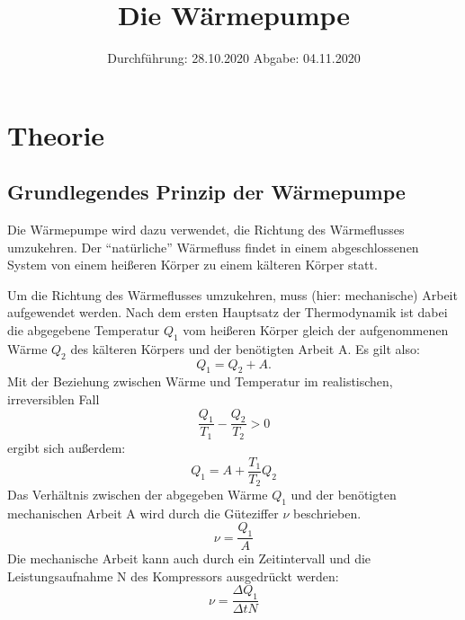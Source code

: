 

\subject{D206}
\title{Die Wärmepumpe}
\date{
    Durchführung: 28.10.2020
    \hspace{3em}
    Abgabe: 04.11.2020
}



\maketitle
\thispagestyle{empty}
\tableofcontents
\newpage

\section{Theorie} \label{sec:Theorie}

\subsection{Grundlegendes Prinzip der Wärmepumpe}

    Die Wärmepumpe wird dazu verwendet, die Richtung des Wärmeflusses umzukehren.
    Der \enquote{natürliche} Wärmefluss findet in einem abgeschlossenen System von einem heißeren Körper
    zu einem kälteren Körper statt.

    Um die Richtung des Wärmeflusses umzukehren, muss (hier: mechanische) Arbeit aufgewendet werden.
    Nach dem ersten Hauptsatz der Thermodynamik ist dabei die abgegebene Temperatur $Q_1$ vom heißeren Körper
    gleich der aufgenommenen Wärme $Q_2$ des kälteren Körpers und der benötigten Arbeit A.
    Es gilt also:
    \begin{equation}
        Q_1 = Q_2 + A .
    \end{equation}
    Mit der Beziehung zwischen Wärme und Temperatur im realistischen, irreversiblen Fall
    \begin{equation}
        \frac{Q_1}{T_1} - \frac{Q_2}{T_2} > 0
    \end{equation}
    ergibt sich außerdem:
    \begin{equation}
        Q_1 = A + \frac{T_1}{T_2} Q_2
    \end{equation}
    Das Verhältnis zwischen der abgegeben Wärme $Q_1$ und der benötigten mechanischen Arbeit A wird durch die Güteziffer $\nu$
    beschrieben.
    \begin{equation}
        \nu = \frac{Q_1}{A}
    \end{equation}
    Die mechanische Arbeit kann auch durch ein Zeitintervall und die Leistungsaufnahme N des Kompressors ausgedrückt werden:
    \begin{equation}
        \nu = \frac{\Delta Q_1}{\Delta t N}
    \end{equation}

